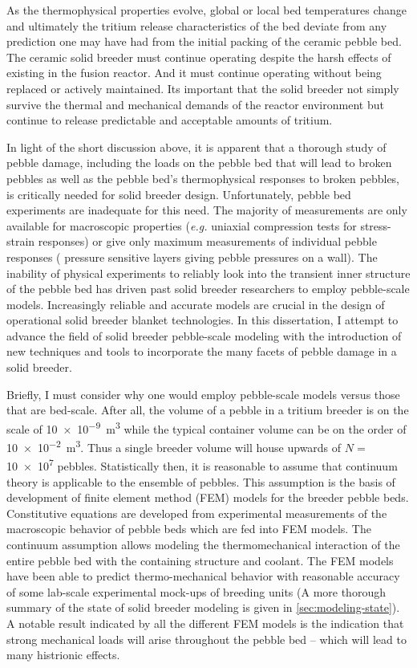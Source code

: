 As the thermophysical properties evolve, global or local bed temperatures change and ultimately the tritium release characteristics of the bed deviate from any prediction one may have had from the initial packing of the ceramic pebble bed. The ceramic solid breeder must continue operating despite the harsh effects of existing in the fusion reactor. And it must continue operating without being replaced or actively maintained. Its important that the solid breeder not simply survive the thermal and mechanical demands of the reactor environment but continue to release predictable and acceptable amounts of tritium. 

In light of the short discussion above, it is apparent that a thorough study of pebble damage, including the loads on the pebble bed that will lead to broken pebbles as well as the pebble bed's thermophysical responses to broken pebbles, is critically needed for solid breeder design. Unfortunately, pebble bed experiments are inadequate for this need. The majority of measurements are only available for macroscopic properties (\textit{e.g.} uniaxial compression tests for stress-strain responses) or give only maximum measurements of individual pebble responses ( pressure sensitive layers giving pebble pressures on a wall). The inability of physical experiments to reliably look into the transient inner structure of the pebble bed has driven past solid breeder researchers to employ pebble-scale models. Increasingly reliable and accurate models are crucial in the design of operational solid breeder blanket technologies. In this dissertation, I attempt to advance the field of solid breeder pebble-scale modeling with the introduction of new techniques and tools to incorporate the many facets of pebble damage in a solid breeder.

Briefly, I must consider why one would employ pebble-scale models versus those that are bed-scale. After all, the volume of a pebble in a tritium breeder is on the scale of \SI{10e-9}{\cubic\meter} while the typical container volume can be on the order of \SI{10e-2}{\cubic\meter}.\cite{Cho2008}  Thus a single breeder volume will house upwards of $N =$\num{10e7} pebbles. Statistically then, it is reasonable to assume that continuum theory is applicable to the ensemble of pebbles. This assumption is the basis of development of finite element method (FEM) models for the breeder pebble beds. Constitutive equations are developed from experimental measurements of the macroscopic behavior of pebble beds which are fed into FEM models. The continuum assumption allows modeling the thermomechanical interaction of the entire pebble bed with the containing structure and coolant. The FEM models have been able to predict thermo-mechanical behavior with reasonable accuracy of some lab-scale experimental mock-ups of breeding units (A more thorough summary of the state of solid breeder modeling is given in \cref{sec:modeling-state}).\cite{DiMaio20081287,Zaccari20081282,Gan:2009vn} A notable result indicated by all the different FEM models is the indication that strong mechanical loads will arise throughout the pebble bed -- which will lead to many histrionic effects. 

